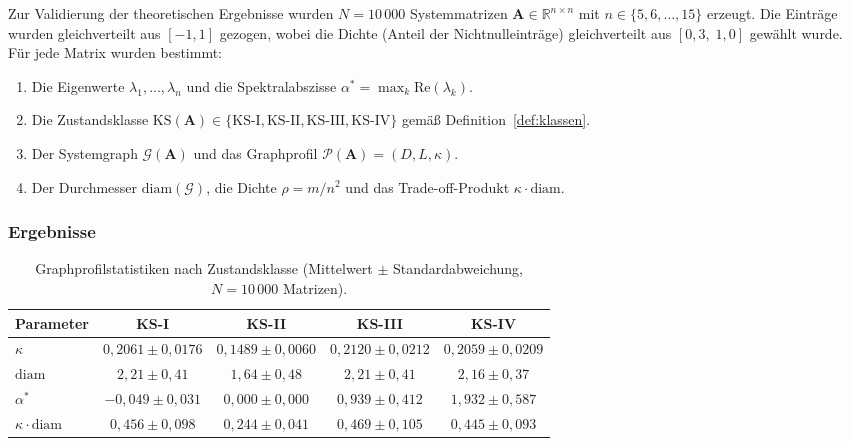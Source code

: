﻿\documentclass[12pt, a4paper, titlepage]{report}
\theoremstyle{definition}
\theoremstyle{remark}
\newcommand{\R}{\mathbb{R}}
\newcommand{\vA}{\bm{A}}
\newcommand{\re}{\mathrm{Re}}
\newcommand{\KS}{\mathrm{KS}}
\begin{document}
Zur Validierung der theoretischen Ergebnisse wurden $N = 10\,000$ Systemmatrizen
$\vA \in \R^{n \times n}$ mit $n \in \{5, 6, \ldots, 15\}$ erzeugt. Die Einträge
wurden gleichverteilt aus $[-1, 1]$ gezogen, wobei die Dichte (Anteil der
Nichtnulleinträge) gleichverteilt aus $[0{,}3,\; 1{,}0]$ gewählt wurde.
Für jede Matrix wurden bestimmt:
\begin{enumerate}[label=(\alph*)]
  \item Die Eigenwerte $\lambda_1, \ldots, \lambda_n$ und die Spektralabszisse
    $\alpha^* = \max_k \re(\lambda_k)$.
  \item Die Zustandsklasse $\KS(\vA) \in \{\text{KS-I}, \text{KS-II}, \text{KS-III},
    \text{KS-IV}\}$ gemäß Definition~\ref{def:klassen}.
  \item Der Systemgraph $\mathcal{G}(\vA)$ und das Graphprofil
    $\mathcal{P}(\vA) = (D, L, \kappa)$.
  \item Der Durchmesser $\mathrm{diam}(\mathcal{G})$, die Dichte
    $\rho = m / n^2$ und das Trade-off-Produkt $\kappa \cdot \mathrm{diam}$.
\end{enumerate}

\subsubsection{Ergebnisse}

\begin{table}[H]
\centering
\caption{Graphprofilstatistiken nach Zustandsklasse (Mittelwert $\pm$ Standardabweichung,
  $N = 10\,000$ Matrizen).}
\label{tab:gpv_statistiken}
\begin{tabular}{lcccc}
\toprule
\textbf{Parameter} & \textbf{KS-I} & \textbf{KS-II} & \textbf{KS-III} & \textbf{KS-IV} \\
\midrule
$\kappa$ & $0{,}2061 \pm 0{,}0176$ & $0{,}1489 \pm 0{,}0060$ & $0{,}2120 \pm 0{,}0212$ & $0{,}2059 \pm 0{,}0209$ \\
$\mathrm{diam}$ & $2{,}21 \pm 0{,}41$ & $1{,}64 \pm 0{,}48$ & $2{,}21 \pm 0{,}41$ & $2{,}16 \pm 0{,}37$ \\
$\alpha^*$ & $-0{,}049 \pm 0{,}031$ & $0{,}000 \pm 0{,}000$ & $0{,}939 \pm 0{,}412$ & $1{,}932 \pm 0{,}587$ \\
$\kappa \cdot \mathrm{diam}$ & $0{,}456 \pm 0{,}098$ & $0{,}244 \pm 0{,}041$ & $0{,}469 \pm 0{,}105$ & $0{,}445 \pm 0{,}093$ \\
\bottomrule
\end{tabular}
\end{table}
\end{document}
